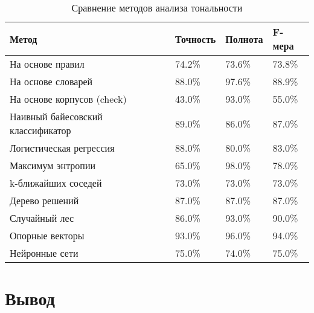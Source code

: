 \noindent
\captionsetup{format=hang,justification=raggedright,
              singlelinecheck=off,width=14.6cm}
\begin{longtable}[c]{|p{5cm}|p{2cm}|p{2cm}|p{1.6cm}|}
\caption{Сравнение методов анализа тональности\label{tab:02}}\\
    \hline
    \textbf{Метод} & \textbf{Точность} & \textbf{Полнота}
                   & \textbf{F-мера}\\
    \hline
    На основе правил\cite{article10}    & 74.2\%
                        & 73.6\%   &  73.8\%\\
    \hline
    На основе словарей \cite{article21}  & 88.0\%
                        & 97.6\%    & 88.9\%\\
    \hline
    На основе корпусов (check)  & 43.0\%
                        & 93.0\% & 55.0\%\\
    \hline
    Наивный
    байесовский
    классификатор       & 89.0\%
                        & 86.0\% & 87.0\%\\
    \hline
    Логистическая
    регрессия           & 88.0\%
                        & 80.0\% & 83.0\%\\
    \hline
    Максимум энтропии   & 65.0\%
                        & 98.0\% & 78.0\%\\
    \hline
    k-ближайших соседей & 73.0\%
                        & 73.0\% & 73.0\%\\
    \hline
    Дерево решений      & 87.0\%
                        & 87.0\% & 87.0\%\\
    \hline
    Случайный лес       & 86.0\%
                        & 93.0\% & 90.0\%\\
    \hline
    Опорные векторы     & 93.0\%
                        & 96.0\% & 94.0\%\\
    \hline
    Нейронные сети      & 75.0\%
                        & 74.0\% & 75.0\%\\
    \hline
\end{longtable}

\section{Вывод}
